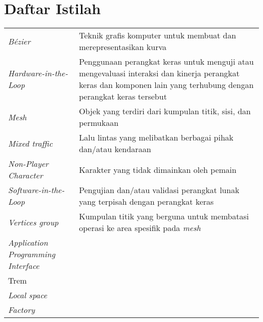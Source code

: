 \chapter*{Daftar Istilah}

\begingroup
\def\arraystretch{1.25}
\begin{tabular}{p{4cm}l}
	\textit{Bézier} & Teknik grafis komputer untuk membuat dan merepresentasikan kurva \\
	\textit{Hardware-in-the-Loop} & Penggunaan perangkat keras untuk menguji atau mengevaluasi interaksi dan kinerja perangkat keras dan komponen lain yang terhubung dengan perangkat keras tersebut \\
	\textit{Mesh} & Objek yang terdiri dari kumpulan titik, sisi, dan permukaan \\
	\textit{Mixed traffic} & Lalu lintas yang melibatkan berbagai pihak dan/atau kendaraan \\
	\textit{Non-Player Character} & Karakter yang tidak dimainkan oleh pemain \\
	\textit{Software-in-the-Loop} & Pengujian dan/atau validasi perangkat lunak yang terpisah dengan perangkat keras \\
	\textit{Vertices group} & Kumpulan titik yang berguna untuk membatasi operasi ke area spesifik pada \textit{mesh} \\

	\textit{Application Programming Interface} & \\
	Trem & \\
	\textit{Local space} & \\
	\textit{Factory} &  \\



\end{tabular}
\endgroup
\clearpage
